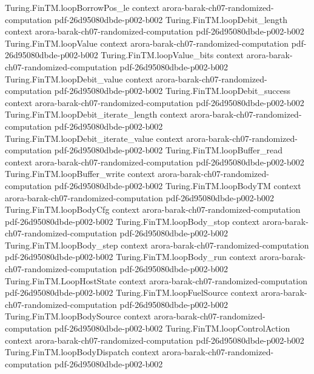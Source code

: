 \begin{theorem}
  {Turing.FinTM.loopBorrowPos_le}
  {context}
  {arora-barak-ch07-randomized-computation}
  {pdf-26d95080dbde-p002-b002}
\proofstep
  {Turing.FinTM.loopDebit_length}
  {context}
  {arora-barak-ch07-randomized-computation}
  {pdf-26d95080dbde-p002-b002}
\proofstep
  {Turing.FinTM.loopValue}
  {context}
  {arora-barak-ch07-randomized-computation}
  {pdf-26d95080dbde-p002-b002}
\proofstep
  {Turing.FinTM.loopValue_bits}
  {context}
  {arora-barak-ch07-randomized-computation}
  {pdf-26d95080dbde-p002-b002}
\proofstep
  {Turing.FinTM.loopDebit_value}
  {context}
  {arora-barak-ch07-randomized-computation}
  {pdf-26d95080dbde-p002-b002}
\proofstep
  {Turing.FinTM.loopDebit_success}
  {context}
  {arora-barak-ch07-randomized-computation}
  {pdf-26d95080dbde-p002-b002}
\proofstep
  {Turing.FinTM.loopDebit_iterate_length}
  {context}
  {arora-barak-ch07-randomized-computation}
  {pdf-26d95080dbde-p002-b002}
\proofstep
  {Turing.FinTM.loopDebit_iterate_value}
  {context}
  {arora-barak-ch07-randomized-computation}
  {pdf-26d95080dbde-p002-b002}
\proofstep
  {Turing.FinTM.loopBuffer_read}
  {context}
  {arora-barak-ch07-randomized-computation}
  {pdf-26d95080dbde-p002-b002}
\proofstep
  {Turing.FinTM.loopBuffer_write}
  {context}
  {arora-barak-ch07-randomized-computation}
  {pdf-26d95080dbde-p002-b002}
\proofstep
  {Turing.FinTM.loopBodyTM}
  {context}
  {arora-barak-ch07-randomized-computation}
  {pdf-26d95080dbde-p002-b002}
\proofstep
  {Turing.FinTM.loopBodyCfg}
  {context}
  {arora-barak-ch07-randomized-computation}
  {pdf-26d95080dbde-p002-b002}
\proofstep
  {Turing.FinTM.loopBody_stop}
  {context}
  {arora-barak-ch07-randomized-computation}
  {pdf-26d95080dbde-p002-b002}
\proofstep
  {Turing.FinTM.loopBody_step}
  {context}
  {arora-barak-ch07-randomized-computation}
  {pdf-26d95080dbde-p002-b002}
\proofstep
  {Turing.FinTM.loopBody_run}
  {context}
  {arora-barak-ch07-randomized-computation}
  {pdf-26d95080dbde-p002-b002}
\proofstep
  {Turing.FinTM.LoopHostState}
  {context}
  {arora-barak-ch07-randomized-computation}
  {pdf-26d95080dbde-p002-b002}
\proofstep
  {Turing.FinTM.loopFuelSource}
  {context}
  {arora-barak-ch07-randomized-computation}
  {pdf-26d95080dbde-p002-b002}
\proofstep
  {Turing.FinTM.loopBodySource}
  {context}
  {arora-barak-ch07-randomized-computation}
  {pdf-26d95080dbde-p002-b002}
\proofstep
  {Turing.FinTM.loopControlAction}
  {context}
  {arora-barak-ch07-randomized-computation}
  {pdf-26d95080dbde-p002-b002}
\proofstep
  {Turing.FinTM.loopBodyDispatch}
  {context}
  {arora-barak-ch07-randomized-computation}
  {pdf-26d95080dbde-p002-b002}

\end{theorem}
